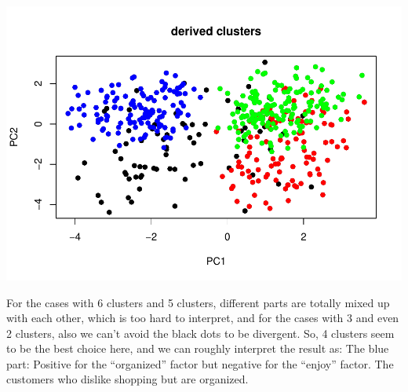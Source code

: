 \documentclass[
  11pt,
]{article}
\newenvironment{Shaded}{\begin{snugshade}}{\end{snugshade}}
\newcommand{\AttributeTok}[1]{\textcolor[rgb]{0.77,0.63,0.00}{#1}}
\newcommand{\CommentTok}[1]{\textcolor[rgb]{0.56,0.35,0.01}{\textit{#1}}}
\newcommand{\DecValTok}[1]{\textcolor[rgb]{0.00,0.00,0.81}{#1}}
\newcommand{\FunctionTok}[1]{\textcolor[rgb]{0.00,0.00,0.00}{#1}}
\newcommand{\NormalTok}[1]{#1}
\newcommand{\SpecialCharTok}[1]{\textcolor[rgb]{0.00,0.00,0.00}{#1}}
\newcommand{\StringTok}[1]{\textcolor[rgb]{0.31,0.60,0.02}{#1}}
\begin{document}
\begin{Shaded}
\end{Shaded}

\includegraphics{report_files/figure-latex/Task_3_116-1.pdf}

For the cases with 6 clusters and 5 clusters, different parts are totally mixed up with each other, which is too hard to interpret, and for the cases with 3 and even 2 clusters, also we can't avoid the black dots to be divergent. So, 4 clusters seem to be the best choice here, and we can roughly interpret the result as:
The blue part: Positive for the ``organized'' factor but negative for the ``enjoy'' factor. The customers who dislike shopping but are organized.
\end{document}
